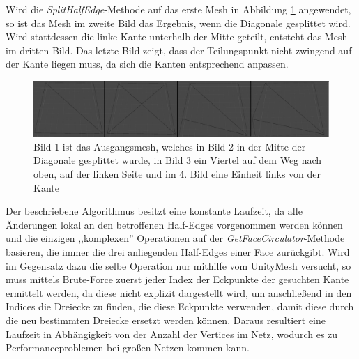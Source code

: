 Wird die \textit{SplitHalfEdge}-Methode auf das erste Mesh in Abbildung \ref{fig:meshmash} angewendet, so ist das Mesh im zweite Bild das Ergebnis, wenn die Diagonale gesplittet wird. Wird stattdessen die linke Kante unterhalb der Mitte geteilt, entsteht das Mesh im dritten Bild. Das letzte Bild zeigt, dass der Teilungspunkt nicht zwingend auf der Kante liegen muss, da sich die Kanten entsprechend anpassen.
\begin{figure}[H]
	\centering
	\includegraphics[width=1 \linewidth]{Images/meshmash}
	\caption{Bild 1 ist das Ausgangsmesh, welches in Bild 2 in der Mitte der Diagonale gesplittet wurde, in Bild 3 ein Viertel auf dem Weg nach oben, auf der linken Seite und im 4. Bild eine Einheit links von der Kante}
	\label{fig:meshmash}
\end{figure}

Der beschriebene Algorithmus besitzt eine konstante Laufzeit, da alle \"Anderungen lokal an den betroffenen Half-Edges vorgenommen werden k\"onnen und die einzigen ,,komplexen'' Operationen auf der \textit{GetFaceCirculator}-Methode basieren, die immer die drei anliegenden Half-Edges einer Face zur\"uckgibt. Wird im Gegensatz dazu die selbe Operation nur mithilfe vom UnityMesh versucht, so muss mittels Brute-Force zuerst jeder Index der Eckpunkte der gesuchten Kante ermittelt werden, da diese nicht explizit dargestellt wird, um anschlie{\ss}end in den Indices die Dreiecke zu finden, die diese Eckpunkte verwenden, damit diese durch die neu bestimmten Dreiecke ersetzt werden k\"onnen. Daraus resultiert eine Laufzeit in Abh\"angigkeit von der Anzahl der Vertices im Netz, wodurch es zu Performanceproblemen bei gro{\ss}en Netzen kommen kann.

